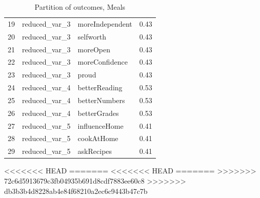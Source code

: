 \documentclass[12pt, a4paper, titlepage]{article}\usepackage[]{graphicx}\usepackage[]{color}
\begin{document}
\begin{table}[ht]
\begin{tabular}{rllr}
  19 & reduced\_var\_3 & moreIndependent & 0.43 \\ 
  20 & reduced\_var\_3 & selfworth & 0.43 \\ 
  21 & reduced\_var\_3 & moreOpen & 0.43 \\ 
  22 & reduced\_var\_3 & moreConfidence & 0.43 \\ 
  23 & reduced\_var\_3 & proud & 0.43 \\ 
  24 & reduced\_var\_4 & betterReading & 0.53 \\ 
  25 & reduced\_var\_4 & betterNumbers & 0.53 \\ 
  26 & reduced\_var\_4 & betterGrades & 0.53 \\ 
  27 & reduced\_var\_5 & influenceHome & 0.41 \\ 
  28 & reduced\_var\_5 & cookAtHome & 0.41 \\ 
  29 & reduced\_var\_5 & askRecipes & 0.41 \\ 
   \hline
\end{tabular}
\caption{Partition of outcomes, Meals} 
\end{table}
<<<<<<< HEAD
=======
<<<<<<< HEAD
=======
>>>>>>> 72c6d5913679c3fb04935b691d8cdf7883ee60c8
>>>>>>> db3b3b4d8228ab4e84f68210a2ec6c9443b47c7b
\end{document}
